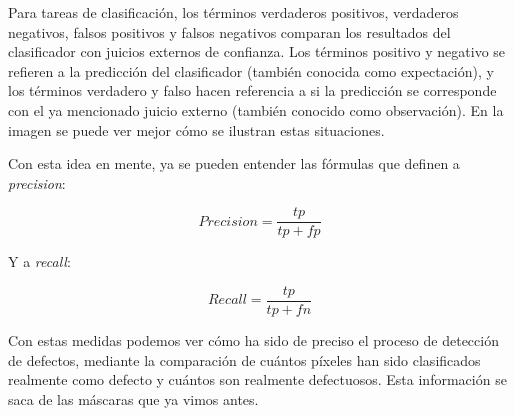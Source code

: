Para tareas de clasificación, los términos verdaderos positivos, verdaderos negativos, falsos positivos y falsos negativos comparan los resultados del clasificador con juicios externos de confianza. Los términos positivo y negativo se refieren a la predicción del clasificador (también conocida como expectación), y los términos verdadero y falso hacen referencia a si la predicción se corresponde con el ya mencionado juicio externo (también conocido como observación). En la imagen  se puede ver mejor cómo se ilustran estas situaciones.


Con esta idea en mente, ya se pueden entender las fórmulas que definen a \textit{precision}:

\[Precision=\frac{tp}{tp+fp}\]

Y a \textit{recall}:

\[Recall=\frac{tp}{tp+fn}\]

Con estas medidas podemos ver cómo ha sido de preciso el proceso de detección de defectos, mediante la comparación de cuántos píxeles han sido clasificados realmente como defecto y cuántos son realmente defectuosos. Esta información se saca de las máscaras que ya vimos antes.